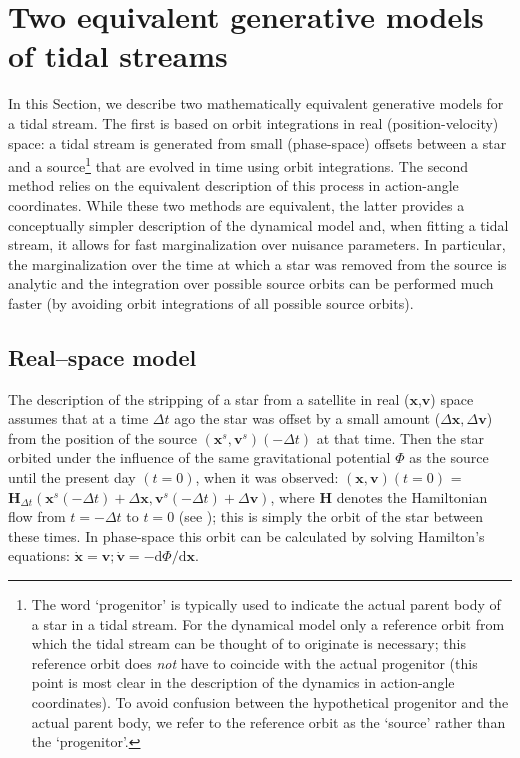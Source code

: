 \documentclass[12pt,preprint]{aastex}
\newcommand{\dd}{\mathrm{d}}
\renewcommand{\vec}[1]{\ensuremath{\mathbf{#1}}}
\newcommand{\vecx}{\ensuremath{\vec{x}}}
\newcommand{\vecv}{\ensuremath{\vec{v}}}
\newcommand{\vech}{\ensuremath{\vec{H}}}
\begin{document}
\section{Two equivalent generative models of tidal streams}\label{sec:method}

In this Section, we describe two mathematically equivalent generative
models for a tidal stream. The first is based on orbit integrations in
real (position-velocity) space: a tidal stream is generated from small
(phase-space) offsets between a star and a source\footnote{The word
  `progenitor' is typically used to indicate the actual parent body of
  a star in a tidal stream. For the dynamical model only a reference
  orbit from which the tidal stream can be thought of to originate is
  necessary; this reference orbit does \emph{not} have to coincide
  with the actual progenitor (this point is most clear in the
  description of the dynamics in action-angle coordinates). To avoid
  confusion between the hypothetical progenitor and the actual parent
  body, we refer to the reference orbit as the `source' rather than
  the `progenitor'.} that are evolved in time using orbit
integrations. The second method relies on the equivalent description
of this process in action-angle coordinates. While these two methods
are equivalent, the latter provides a conceptually simpler description
of the dynamical model and, when fitting a tidal stream, it allows for
fast marginalization over nuisance parameters. In particular, the
marginalization over the time at which a star was removed from the
source is analytic and the integration over possible source orbits can
be performed much faster (by avoiding orbit integrations of all
possible source orbits).

\subsection{Real--space model}\label{sec:realmethod}

The description of the stripping of a star from a satellite in real
(\vecx,\vecv) space assumes that at a time $\Delta t$ ago the star was
offset by a small amount ($\Delta \vecx,\Delta \vecv$) from the
position of the source $(\vecx^s,\vecv^s)(-\Delta t)$ at that
time. Then the star orbited under the influence of the same
gravitational potential $\Phi$ as the source until the present day
$(t=0)$, when it was observed: $(\vecx,\vecv)(t=0)$ = $\vech_{\Delta
  t}(\vecx^s(-\Delta t)+\Delta \vecx,\vecv^s(-\Delta t)+\Delta
\vecv)$, where $\vech$ denotes the Hamiltonian flow from $t=-\Delta t$
to $t=0$ (see \citealt{binneytremaine}); this is simply the orbit of
the star between these times. In phase-space this orbit can be
calculated by solving Hamilton's equations: $\dot{\vecx} = \vecv;
\dot{\vecv} = - \dd \Phi / \dd \vecx$. 
\end{document}
